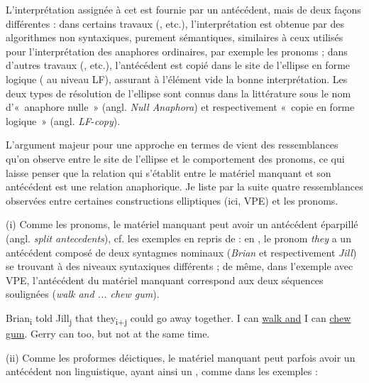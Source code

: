 L’interprétation assignée à cet  est fournie par un antécédent, mais de deux façons différentes : dans certains travaux (\citealt{Wasow1972,Shopen1972,Williams1977,Zribi-Hertz1986,Hardt1993,Lobeck1995,Depiante2000,Ludlow2005}, etc.), l’interprétation est obtenue par des algorithmes non synta\-xiques, purement sémantiques, similaires à ceux utilisés pour l’interprétation des anaphores ordinaires, par exemple les pronoms ; dans d’autres travaux (\citealt{FiengoEtAl1994,ChungEtAl1995,Lappin1999,BeaversEtAl2004,Fortin2007}, etc.), l’antécédent est copié dans le site de l’ellipse en forme logique ({\cad} au niveau LF), assurant à l’élément vide la bonne interprétation. Les deux types de résolution de l’ellipse sont connus dans la littérature sous le nom d’«~anaphore nulle~» (angl. \textit{Null Anaphora}) et respectivement «~copie en forme logique~» (angl. \textit{LF}{}-\textit{copy}).

L’argument majeur pour une approche en termes de  vient des ressemblances qu’on observe entre le site de l’ellipse et le comportement des pronoms, ce qui laisse penser que la relation qui s’établit entre le matériel manquant et son antécédent est une relation anaphorique. Je liste par la suite quatre ressemblances observées entre certaines constructions elliptiques (ici, VPE) et les pronoms.  

(i) Comme les pronoms, le matériel manquant peut avoir un antécédent épar\-pillé (angl. \textit{split antecedents}), cf. les exemples en  repris de \citet{Hardt1993} : en , le pronom \textit{they} a un antécédent composé de deux syntagmes nominaux (\textit{Brian} et respectivement \textit{Jill}) se trouvant à des niveaux syntaxiques {différents ;} de même, dans l’exemple  avec VPE, l’antécédent du matériel manquant correspond aux deux séquences soulignées (\textit{walk and ... chew gum}).

  \ea \label{ch1:ex116}
  \ea  Brian\textsubscript{i} told Jill\textsubscript{j} that they\textsubscript{i+j} could go away together. \label{ch1:ex116a} 
  \ex  I can \uline{walk and} I can \uline{chew gum}. Gerry can too, but not at the same time. \label{ch1:ex116b}  
  \z
  \z 

(ii) Comme les proformes déictiques, le matériel manquant peut parfois avoir un antécédent non linguistique, ayant ainsi un , comme dans les exemples  :

